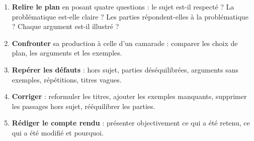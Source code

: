\documentclass[11pt]{article}
\begin{document}
\begin{methode}
\begin{enumerate}
\item \textbf{Relire le plan} en posant quatre questions : le sujet est-il respecté ? La problématique est-elle claire ? Les parties répondent-elles à la problématique ? Chaque argument est-il illustré ?
\item \textbf{Confronter} sa production à celle d'un camarade : comparer les choix de plan, les arguments et les exemples.
\item \textbf{Repérer les défauts} : hors sujet, parties déséquilibrées, arguments sans exemples, répétitions, titres vagues.
\item \textbf{Corriger} : reformuler les titres, ajouter les exemples manquants, supprimer les passages hors sujet, rééquilibrer les parties.
\item \textbf{Rédiger le compte rendu} : présenter objectivement ce qui a été retenu, ce qui a été modifié et pourquoi.
\end{enumerate}
\end{methode}
\end{document}
